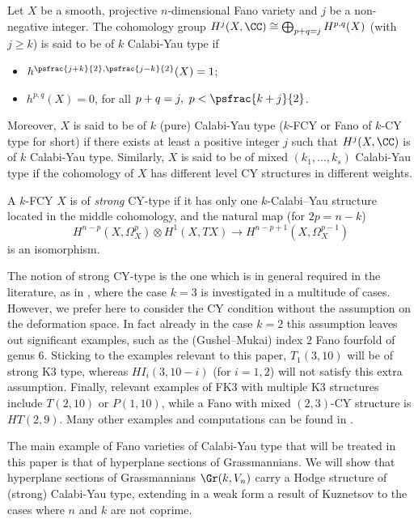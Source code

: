 \begin{defin}\label{def:CYtype}
Let $X$ be a smooth, projective $n$-dimensional Fano variety and $j$ be a non-negative integer. The cohomology group $H^j(X, \CC) \cong \bigoplus_{p+q=j} H^{p,q}(X)$ (with $j \geq k$) is said to be of $k$ Calabi-Yau type if
\begin{itemize}
\item $h^{\psfrac{j+k}{2},\psfrac{j-k}{2}}(X)=1$;
\item $h^{p,q}(X)=0$, for all $p+q=j, \ p <\psfrac{k+j}{2}$.
\end{itemize}
Moreover, $X$ is said to be of $k$ (pure) Calabi-Yau type ($k$-FCY or Fano of $k$-CY type for short) if there exists at least a positive integer $j$ such that $H^j(X, \CC)$ is of $k$ Calabi-Yau type. Similarly, $X$ is said to be of mixed $(k_1, \ldots, k_s)$ Calabi-Yau type if the cohomology of $X$ has different level CY structures in different weights.

A $k$-FCY $X$ is of \emph{strong} CY-type if it has only one $k$-Calabi--Yau structure located in the middle cohomology, and the natural map (for $2p=n-k$)
\[
H^{n-p}(X,\Omega_X^p)\otimes H^1(X,TX)\to H^{n-p+1}(X,\Omega_X^{p-1})
\]
is an isomorphism.
\end{defin}

The notion of strong CY-type is the one which is in general required in the literature, as
in \cite{imcy}, where the case $k=3$ is investigated in a multitude of cases. However, we prefer here to consider the CY condition without the assumption on the deformation space.
In fact already in the case $k=2$ this assumption leaves out significant examples, such as the (Gushel--Mukai) index $2$ Fano fourfold of genus $6$.
Sticking to the examples relevant to this paper, $T_1(3,10)$ will be of strong K3 type, whereas $HI_i(3,10-i)$ (for $i=1,2$) will not satisfy this extra assumption. Finally, relevant examples of FK3 with multiple K3 structures include $T(2,10)$ or $P(1,10)$, while a Fano with mixed $(2,3)$-CY structure is $HT(2,9)$. Many other examples and computations can be found in \cite{fm}.

The main example of Fano varieties of Calabi-Yau type that will be treated in this paper is that
of hyperplane sections of Grassmannians.
We will show that hyperplane sections of Grassmannians $\Gr(k,V_n)$ carry a Hodge structure of (strong) Calabi-Yau type, extending in a weak form a result of Kuznetsov to the cases where $n$ and $k$ are not coprime.

